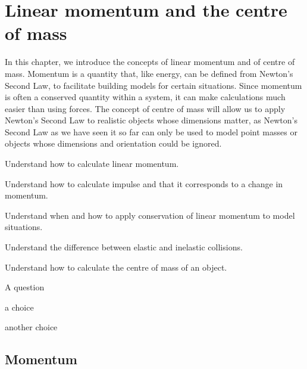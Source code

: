 
\chapter{Linear momentum and the centre of mass}
\label{chapter:momentumandcm}
In this chapter, we introduce the concepts of linear momentum and of centre of mass. Momentum is a quantity that, like energy, can be defined from Newton's Second Law, to facilitate building models for certain situations. Since momentum is often a conserved quantity within a system, it can make calculations much easier than using forces. The concept of centre of mass will allow us to apply Newton's Second Law to realistic objects whose dimensions matter, as Newton's Second Law as we have seen it so far can only be used to model point masses or objects whose dimensions and orientation could be ignored.

\begin{learningObjectives}{
 \item Understand how to calculate linear momentum.
 \item Understand how to calculate impulse and that it corresponds to a change in momentum.
 \item Understand when and how to apply conservation of linear momentum to model situations.
 \item Understand the difference between elastic and inelastic collisions.
 \item Understand how to calculate the centre of mass of an object.
}
\end{learningObjectives}

\begin{opening}
\begin{MCquestion}{A question}
\item a choice
\item another choice %
\end{MCquestion}
\end{opening}


\section{Momentum}
